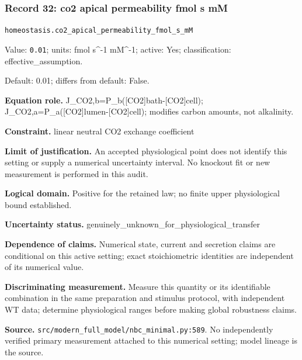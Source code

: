 \subsubsection*{Record 32: co2 apical permeability fmol s mM}
{\small \nolinkurl{homeostasis.co2_apical_permeability_fmol_s_mM}\par

Value: \texttt{0.01}; units: fmol s\textasciicircum{}-1 mM\textasciicircum{}-1; active: Yes; classification: effective\_assumption.\par

Default: 0.01; differs from default: False.\par

\textbf{Equation role.} J\_CO2,b=P\_b([CO2]bath-[CO2]cell); J\_CO2,a=P\_a([CO2]lumen-[CO2]cell); modifies carbon amounts, not alkalinity.\par

\textbf{Constraint.} linear neutral CO2 exchange coefficient\par

\textbf{Limit of justification.} An accepted physiological point does not identify this setting or supply a numerical uncertainty interval. No knockout fit or new measurement is performed in this audit.\par

\textbf{Logical domain.} Positive for the retained law; no finite upper physiological bound established.\par

\textbf{Uncertainty status.} genuinely\_unknown\_for\_physiological\_transfer\par

\textbf{Dependence of claims.} Numerical state, current and secretion claims are conditional on this active setting; exact stoichiometric identities are independent of its numerical value.\par

\textbf{Discriminating measurement.} Measure this quantity or its identifiable combination in the same preparation and stimulus protocol, with independent WT data; determine physiological ranges before making global robustness claims.\par

\textbf{Source.} \nolinkurl{src/modern_full_model/nbc_minimal.py:589}. No independently verified primary measurement attached to this numerical setting; model lineage is the source.\par}

